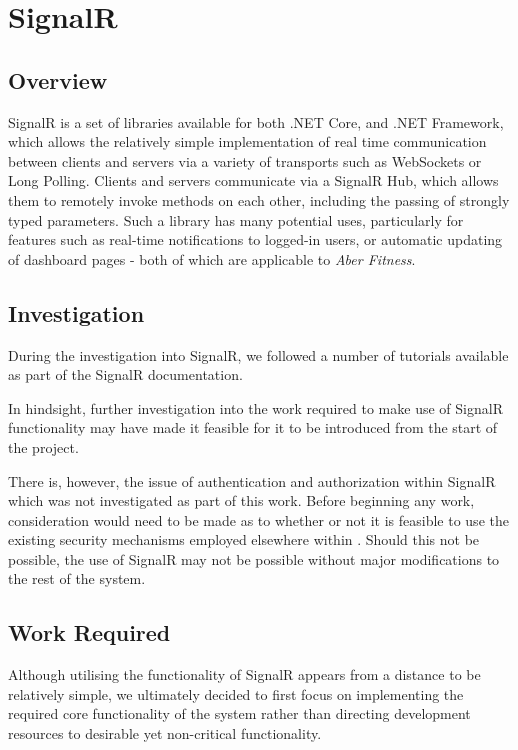 \section{SignalR}

\subsection{Overview}

SignalR is a set of libraries available for both .NET Core, and .NET Framework, which allows the relatively simple implementation of real time communication between clients and servers via a variety of transports such as WebSockets or Long Polling\cite{SignalR}. Clients and servers communicate via a SignalR Hub, which allows them to remotely invoke methods on each other, including the passing of strongly typed parameters. Such a library has many potential uses, particularly for features such as real-time notifications to logged-in users, or automatic updating of dashboard pages - both of which are applicable to \textit{Aber Fitness}.

\subsection{Investigation}

During the investigation into SignalR, we followed a number of tutorials available as part of the SignalR documentation.

In hindsight, further investigation into the work required to make use of SignalR functionality may have made it feasible for it to be introduced from the start of the project.

There is, however, the issue of authentication and authorization within SignalR which was not investigated as part of this work. Before beginning any work, consideration would need to be made as to whether or not it is feasible to use the existing security mechanisms employed elsewhere within . Should this not be possible, the use of SignalR may not be possible without major modifications to the rest of the system.

\subsection{Work Required}

Although utilising the functionality of SignalR appears from a distance to be relatively simple, we ultimately decided to first focus on implementing the required core functionality of the system rather than directing development resources to desirable yet non-critical functionality.

